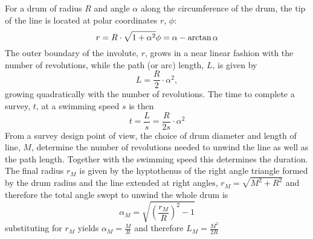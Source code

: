 For a drum of radius $R$ and angle $\alpha$ along the circumference of the drum, the tip of the line is located at polar coordinates $r$, $\phi$:  
\begin{equation}
r = R\cdot\sqrt{1+\alpha^2} \\
\phi = \alpha - \arctan{\alpha} 
\end{equation}
The outer boundary of the involute, $r$, grows in a near linear fashion with the number of revolutions, while the path (or arc) length, $L$, is given by
\begin{equation}
L=\frac{R}{2}\cdot\alpha^2,
\end{equation}
growing quadratically with the number of revolutions. The time to complete a survey, $t$, at a swimming speed $s$ is then
\begin{equation}
t = \frac{L}{s} = \frac{R}{2s}\cdot\alpha^2
\end{equation}
From a survey design point of view, the choice of drum diameter and length of line, $M$, determine the number of revolutions needed to unwind the line as well as the path length. Together with the swimming speed this determines the duration. The final radius $r_M$ is given by the hyptothenus of the right angle triangle formed by the drum radius and the line extended at right angles, $r_M = \sqrt{M^2 + R^2}$ and therefore the total angle swept to unwind the whole drum is 
\begin{equation}
\alpha_M = \sqrt{\left(\frac{r_M}{R}\right)^2 - 1}
\end{equation}
substituting for $r_M$ yields $\alpha_M = \frac{M}{R}$ and therefore $L_M = \frac{M^2}{2R}$

